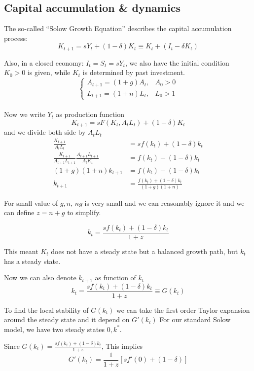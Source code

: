 \documentclass[twocolumn, fleqn]{article}
\begin{document}
		\subsection{Capital accumulation \& dynamics}
			The so-called ``Solow Growth Equation'' describes the capital accumulation process:
			\[K_{t+1} = s Y_t + (1-\delta)K_t \equiv K_t + (I_t -\delta K_t)\]

			Also, in a closed economy: $I_t = S_t = s Y_t$, we also have the initial condition $K_0 >0$ is
			given, while $K_t$ is determined by past investment.\\

			\[
			\begin{cases}
				A_{t+1} = (1+g)A_t, & A_0 >0\\
				L_{t+1} = (1+n)L_t, & L_0 >1
			\end{cases}\]\\

			Now we write $Y_t$ as production function
			\[K_{t+1} = s F(K_t, A_t L_t)+(1-\delta)K_t\]
			and we divide both side by $A_t L_t$
			\begin{align*}
				\frac{K_{t+1}}{A_t L_t} &= s f(k_t) + (1-\delta)k_t\\[4pt]
				\frac{K_{t+1}}{A_{t+1} L_{t+1}} \frac{A_{t+1} L_{t+1}}{A_t K_t} &=  f(k_t) + (1-\delta)k_t\\[4pt]
				(1+g)(1+n)k_{t+1} &=  f(k_t) + (1-\delta)k_t\\[4pt]
				k_{t+1} &= \frac{ f(k_t) + (1-\delta)k_t}{(1+g)(1+n)}
			\end{align*}

			For small value of $g, n$, $ng$ is very small and we can reasonably ignore it and we can define
			$z = n+g$ to simplify.

			\begin{equation}
				k_t = \frac{s f(k_t)+(1-\delta)k_t}{1+z}\label{eq:solowss}
			\end{equation}

			This meant $K_t$ does not have a steady state but a balanced growth path, but $k_t$ has a steady state.

			Now we can also denote $k_{t+1}$ as function of $k_t$
			\[k_t = \frac{s f(k_t)+(1-\delta)k_t}{1+z} \equiv G(k_t)\]

			To find the local stability of $G(k_t)$ we can take the first order Taylor expansion around the
			steady state and it depend on $G'(k_t)$
			For our standard Solow model, we have two steady states $0, k^\ast$.

			Since $G(k_t) = \frac{s f(k_t)+(1-\delta)k_t}{1+z}$,
			This implies \[G'(k_t) = \frac{1}{1+z}[sf'(0)+(1-\delta)]\]
\end{document}
